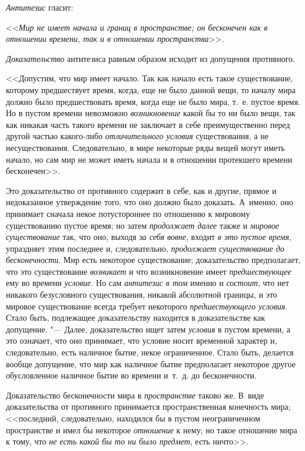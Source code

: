 {\em Антитезис} гласит:

<<{\em Мир не имеет начала и границ в пространстве; он
бесконечен как в отношении времени, так и в отношении пространства}>>.

{\em Доказательство} антитезиса равным образом исходит
из допущения противного.

<<Допустим, что мир имеет начало. Так как начало есть такое существование,
которому предшествует время, когда, еще не было данной вещи, то началу мира
должно было предшествовать время, когда еще не было мира, т.~е. пустое
время. Но в пустом времени невозможно
{\em возникновение} какой бы то ни было вещи, так как
никакая часть такого времени не заключает в себе преимущественно перед
другой частью какого-либо {\em отличительного условия}
существования, а не несуществования. Следовательно, в мире некоторые ряды
вещей могут иметь начало, но сам мир не может иметь начала и в отношении
протекшего времени бесконечен>>.

Это доказательство от противного содержит в себе, как и другие, прямое и
недоказанное утверждение того, что оно должно было доказать. А~именно, оно
принимает сначала некое потустороннее по отношению к мировому существованию
пустое время; но затем {\em продолжает далее} также и
{\em мировое существование} так, что оно, выходя
{\em за себя вовне}, входит {\em в
это пустое время}, упраздняет этим последнее и, следовательно,
{\em продолжает существование до бесконечности}. Мир
есть некоторое существование; доказательство предполагает, что это
существование {\em возникает} и что возникновение имеет
{\em предшествующее} ему во времени
{\em условие}. Но сам
{\em антитезис в том} именно и
{\em состоит}, что нет никакого безусловного
существования, никакой абсолютной границы, и это мировое существование
всегда требует некоторого {\em предшествующего
условия}. Стало быть, подлежащее доказательству находится в доказательстве
как допущение. "--- Далее, доказательство ищет затем
{\em условия} в пустом времени, а это означает, что оно
принимает, что условие носит временной характер и, следовательно, есть
наличное бытие, некое ограниченное. Стало быть, делается вообще допущение,
что мир как наличное бытие предполагает некоторое другое обусловленное
наличное бытие во времени и~т.~д. до бесконечности.

Доказательство бесконечности мира в {\em пространстве}
таково же. В~виде доказательства от противного принимается пространственная
конечность мира; <<последний, следовательно, находился бы в пустом
неограниченном пространстве и имел бы некоторое
{\em отношение} к нему; но такое отношение мира к тому,
что {\em не есть какой бы то ни было предмет}, есть
ничто>>.

